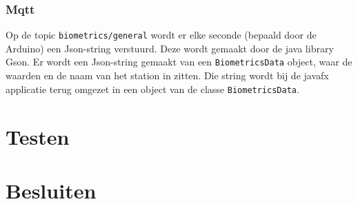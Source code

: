 \documentclass[a4paper]{report}
\newcommand{\code}[1]{\colorbox{light-gray}{\texttt{#1}}}
\begin{document}
        \subsection{Mqtt}
            Op de topic \code{biometrics/general} wordt er elke seconde (bepaald door de Arduino) een Json-string verstuurd.
            Deze wordt gemaakt door de java library Gson.
            Er wordt een Json-string gemaakt van een \code{BiometricsData} object, waar de waarden en de naam van het station in zitten.
            Die string wordt bij de javafx applicatie terug omgezet in een object van de classe \code{BiometricsData}.
            
\chapter{Testen}

\chapter{Besluiten}
\end{document}
